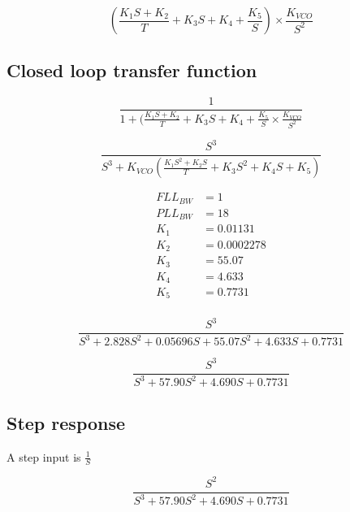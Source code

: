 \begin{equation}
(\frac{K_1 S + K_2}{T} + K_3  S + K_4 + \frac{K_5}{S} ) \times \frac{K_{VCO}}{S^2}
\end{equation}

\subsection{Closed loop transfer function}

\begin{comment}
PLL/FLL S^2 Ratio = 19.4
PLL/FLL S Ratio = 81.3339
\end{comment}

\begin{equation}
\frac{1}{1+(\frac{K_1 S + K_2}{T} + K_3  S +K_4  + \frac{K_5}{S}  \times \frac{K_{VCO}}{S^2}}
\end{equation}


\begin{equation}
\frac{S^3}{S^3 + K_{VCO}(\frac{K_1 S^2 + K_2 S}{T} + K_3 S^2 + K_4 S + K_5)}
\end{equation}

\begin{align}
FLL_{BW}&=1\\
PLL_{BW}&=18\\
K_1 &=  0.01131\\
K_2 &=  0.0002278\\
K_3 &= 55.07\\
K_4 &= 4.633\\
K_5 &= 0.7731\\
\end{align}

\begin{equation}
\frac{S^3}{S^3 +2.828 S^2 + 0.05696 S + 55.07 S^2 + 4.633 S + 0.7731}
\end{equation}

\begin{equation}
\frac{S^3}{S^3 +57.90 S^2 + 4.690 S +0.7731}
\end{equation}

\subsection{Step response}

A step input is $\frac{1}{S}$

\begin{equation}
\frac{S^2}{S^3 +57.90 S^2 + 4.690 S +0.7731}
\end{equation}

